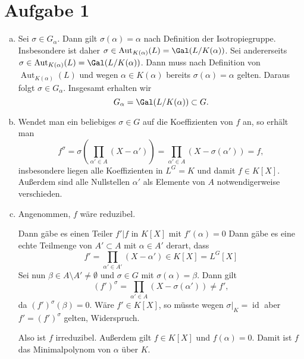 \documentclass{article}
\begin{document}
\def\headheight{25pt}
\section*{Aufgabe 1}
\begin{enumerate}[(a)]
    \item Sei $\sigma \in G_\alpha$. Dann gilt $\sigma(\alpha) = \alpha$ nach Definition der Isotropiegruppe.
    Insbesondere ist daher $\sigma \in \operatorname{Aut}_{K(\alpha)}(L) = \Gal(L/K(\alpha))$.
    Sei andererseits $\sigma \in \operatorname{Aut}_{K(\alpha)}(L) = \Gal(L/K(\alpha))$. 
    Dann muss nach Definition von $\operatorname{Aut}_{K(\alpha)}(L)$ und wegen $\alpha \in K(\alpha)$ bereits 
    $\sigma(\alpha) = \alpha$ gelten. Daraus folgt $\sigma \in G_\alpha$. Insgesamt erhalten wir 
    \[
        G_\alpha = \Gal(L/K(\alpha)) \subset G.  
    \]
    \item Wendet man ein beliebiges $\sigma \in G$ auf die Koeffizienten von $f$ an, so erhält man
    \[
        f^{\sigma} = \sigma\left(\prod_{\alpha' \in A} (X-\alpha')\right) = \prod_{\alpha' \in A} (X - \sigma(\alpha')) = f,
    \]
    insbesondere liegen alle Koeffizienten in $L^G = K$ und damit $f\in K[X]$. 
    Außerdem sind alle Nullstellen $\alpha'$ als Elemente von $A$ notwendigerweise verschieden.
    \item Angenommen, $f$ wäre reduzibel. 
    
    Dann gäbe es einen Teiler $f' | f$ in $K[X]$ mit $f'(\alpha) = 0$
    Dann gäbe es eine echte Teilmenge von $A'\subset A$ mit $\alpha \in A'$ derart, dass 
    \[
        f' = \prod_{\alpha' \in A'} (X - \alpha') \in K[X] = L^G[X]
    \]
    Sei nun $\beta \in A \setminus A' \neq \emptyset$ und $\sigma \in G$ mit $\sigma(\alpha) = \beta$. Dann gilt
    \[
        (f')^\sigma = \prod_{\alpha' \in A} (X- \sigma(\alpha')) \neq f',
    \]
    da $(f')^\sigma(\beta) = 0$. 
    Wäre $f' \in K[X]$, so müsste wegen $\sigma|_K = \operatorname{id}$ aber $f' = (f')^\sigma$ gelten, Widerspruch.

    Also ist $f$ irreduzibel. Außerdem gilt $f \in K[X]$ und $f(\alpha) = 0$. 
    Damit ist $f$ das Minimalpolynom von $\alpha$ über $K$.
\end{enumerate}
\end{document}
